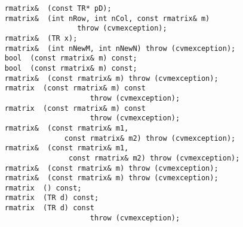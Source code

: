 \verb"    rmatrix& "\verb" (const TR* pD);"\\
\verb"    rmatrix& "\verb" (int nRow, int nCol, const rmatrix& m)"\\
\verb"                     throw (cvmexception);"\\
\verb"    rmatrix& "\verb" (TR x);"\\
\verb"    rmatrix& "\verb" (int nNewM, int nNewN) throw (cvmexception);"\\
\verb"    bool "\verb" (const rmatrix& m) const;"\\
\verb"    bool "\verb" (const rmatrix& m) const;"\\
\verb"    rmatrix& "\verb" (const rmatrix& m) throw (cvmexception);"\\
\verb"    rmatrix "\verb" (const rmatrix& m) const"\\
\verb"                        throw (cvmexception);"\\
\verb"    rmatrix "\verb" (const rmatrix& m) const"\\
\verb"                        throw (cvmexception);"\\
\verb"    rmatrix& "\verb" (const rmatrix& m1,"\\
\verb"                  const rmatrix& m2) throw (cvmexception);"\\
\verb"    rmatrix& "\verb" (const rmatrix& m1,"\\
\verb"                   const rmatrix& m2) throw (cvmexception);"\\
\verb"    rmatrix& "\verb" (const rmatrix& m) throw (cvmexception);"\\
\verb"    rmatrix& "\verb" (const rmatrix& m) throw (cvmexception);"\\
\verb"    rmatrix "\verb" () const;"\\
\verb"    rmatrix "\verb" (TR d) const;"\\
\verb"    rmatrix "\verb" (TR d) const"\\
\verb"                        throw (cvmexception);"\\
